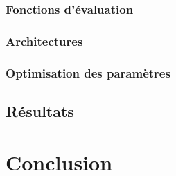 \documentclass{report}
\begin{document}
		\subsection{Fonctions d'évaluation}
				
		\subsection{Architectures}
			
		\subsection{Optimisation des paramètres}
			
		
	\section{Résultats}
		




\chapter{Conclusion}
	






\addappheadtotoc
\appendixpage

\appendix


\end{document}
